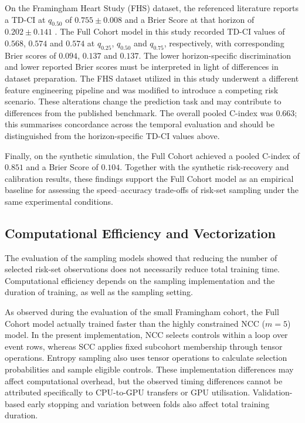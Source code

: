 \documentclass[a4paper,twoside,12pt]{report}
\begin{document}
On the Framingham Heart Study (FHS) dataset, the referenced literature reports a TD-CI at $q_{0.50}$ of $0.755 \pm 0.008$ and a Brier Score at that horizon of $0.202 \pm 0.141$ \citep{InterpretableFineGray2025}. The Full Cohort model in this study recorded TD-CI values of $0.568$, $0.574$ and $0.574$ at $q_{0.25}$, $q_{0.50}$ and $q_{0.75}$, respectively, with corresponding Brier scores of $0.094$, $0.137$ and $0.137$. The lower horizon-specific discrimination and lower reported Brier scores must be interpreted in light of differences in dataset preparation. The FHS dataset utilized in this study underwent a different feature engineering pipeline and was modified to introduce a competing risk scenario. These alterations change the prediction task and may contribute to differences from the published benchmark. The overall pooled C-index was $0.663$; this summarises concordance across the temporal evaluation and should be distinguished from the horizon-specific TD-CI values above.

Finally, on the synthetic simulation, the Full Cohort achieved a pooled C-index of $0.851$ and a Brier Score of $0.104$. Together with the synthetic risk-recovery and calibration results, these findings support the Full Cohort model as an empirical baseline for assessing the speed--accuracy trade-offs of risk-set sampling under the same experimental conditions.


\subsection{Computational Efficiency and Vectorization}

The evaluation of the sampling models showed that reducing the number of selected risk-set observations does not necessarily reduce total training time. Computational efficiency depends on the sampling implementation and the duration of training, as well as the sampling setting.

As observed during the evaluation of the small Framingham cohort, the Full Cohort model actually trained faster than the highly constrained NCC ($m=5$) model. In the present implementation, NCC selects controls within a loop over event rows, whereas SCC applies fixed subcohort membership through tensor operations. Entropy sampling also uses tensor operations to calculate selection probabilities and sample eligible controls. These implementation differences may affect computational overhead, but the observed timing differences cannot be attributed specifically to CPU-to-GPU transfers or GPU utilisation. Validation-based early stopping and variation between folds also affect total training duration.
\end{document}

